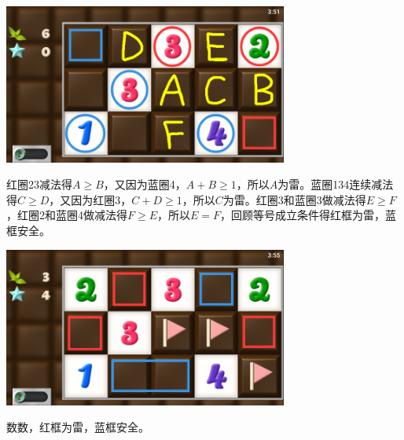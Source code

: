 \subsection{} %
\begin{center}
    \includegraphics[width=0.7\textwidth]{puzzle/97-1.png}
\end{center}
红圈23减法得$A\ge B$，又因为蓝圈4，$A+B\ge 1$，所以$A$为雷。蓝圈134连续减法得$C\ge D$，又因为红圈3，$C+D\ge 1$，所以$C$为雷。红圈3和蓝圈3做减法得$E\ge F$，红圈2和蓝圈4做减法得$F\ge E$，所以$E=F$，回顾等号成立条件得红框为雷，蓝框安全。
\begin{center}
    \includegraphics[width=0.7\textwidth]{puzzle/97-2.png}
\end{center}
数数，红框为雷，蓝框安全。

